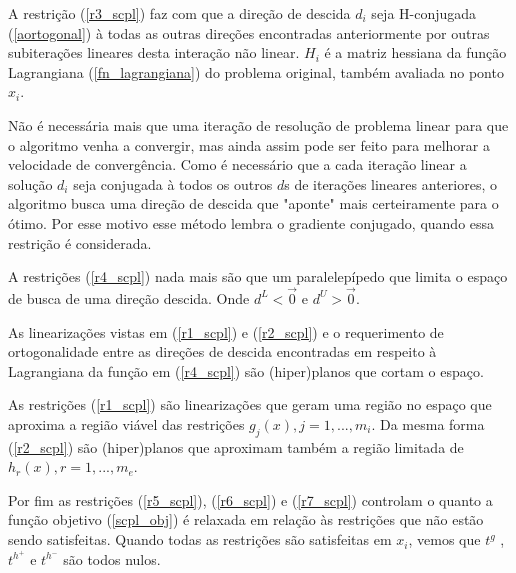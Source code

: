 A restrição (\ref{r3_scpl}) faz com que a direção de descida \( d_i \) seja H-conjugada (\ref{aortogonal}) à todas
as outras direções encontradas anteriormente por outras subiterações lineares desta
interação não linear. \( H_i \) é a matriz hessiana da função Lagrangiana (\ref{fn_lagrangiana}) do problema
original, também avaliada no ponto \( x_i \).

Não é necessária mais que uma iteração de resolução de problema linear para
que o algoritmo venha a convergir, mas ainda assim pode ser feito para melhorar a velocidade
de convergência. Como é necessário que a cada iteração linear a solução
\( d_i \) seja conjugada à todos os outros \(d\)s de iterações lineares anteriores, o
algoritmo busca uma direção de descida que "aponte" mais certeiramente para o ótimo.
Por esse motivo esse método lembra o gradiente conjugado, quando essa restrição é
considerada.

A restrições (\ref{r4_scpl}) nada mais são que um paralelepípedo que limita o espaço de busca de uma
direção descida. Onde \( d^L < \overrightarrow 0 \) e \( d^U > \overrightarrow 0 \).

As linearizações vistas em (\ref{r1_scpl}) e (\ref{r2_scpl}) e o requerimento de ortogonalidade entre
as direções de descida encontradas em respeito à Lagrangiana da função em (\ref{r4_scpl}) são (hiper)planos
que cortam o espaço.

As restrições (\ref{r1_scpl}) são linearizações que geram uma região no espaço que aproxima a região viável
das restrições \( g_j(x), j=1, ..., m_i \). Da mesma forma (\ref{r2_scpl}) são (hiper)planos que aproximam
também a região limitada de \( h_r(x), r=1, ..., m_e \).

Por fim as restrições (\ref{r5_scpl}), (\ref{r6_scpl}) e (\ref{r7_scpl}) controlam o quanto a função objetivo
(\ref{scpl_obj}) é relaxada em relação às restrições que não estão sendo satisfeitas. Quando todas as restrições
são satisfeitas em \(x_i\), vemos que \( t^g \) ,\(t^{h^+}\) e \(t^{h^-} \) são todos nulos.


